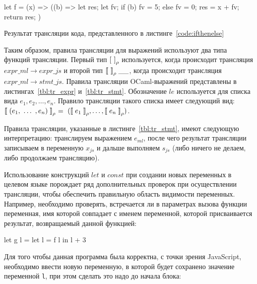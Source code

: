 \begin{listing}
\begin{pyglist}[language=ocaml,numbers=none,numbersep=5pt, fontsize=\small]
let f = (x) => ((b) => {
    let res;
    let fv;
    if (b) {fv = 5;} else {fv = 0;}
    res = x + fv;
    return res;
})
\end{pyglist}
\caption{Результат трансляции кода, представленного в листинге~\ref{code:ifthenelse}}
\label{code:ifthenelse_tr}
\end{listing}

Таким образом, правила трансляции для выражений используют два типа функций трансляции. Первый тип $\mathrel{{[}}~\mathrel{{]}}_{\rho}$ используется, когда происходит трансляция $expr\_ml \to expr\_js$ и второй тип $\mathrel{{\llbracket}}~\mathrel{{\rrbracket}}_{\rho} \_ \_$, когда происходит трансляция $expr\_ml \to stmt\_js$. Правила трансляции OCaml-выражений представлены в листингах~\ref{tbl:tr_expr} и~\ref{tbl:tr_stmt}. Обозначение $le$ используется для списка вида $e_1, e_2, \ldots, e_n$. Правило трансляции такого списка имеет следующий вид: $\mathrel{{\llbracket}} (e_1, ~\ldots~, e_n) \mathrel{{\rrbracket}} _{\rho} ~=~ (\mathrel{{\llbracket}} e_1 \mathrel{{\rrbracket}} _{\rho}, \ldots, \mathrel{{\llbracket}} e_n \mathrel{{\rrbracket}} _{\rho})$.

Правила трансляции, указанные в листинге~\ref{tbl:tr_stmt}, имеют следующую интерпретацию: транслируем выражением $e_{ml}$, после чего результат трансляции записываем в переменную $x_{js}$ и дальше выполняем $s_{js}$ (либо ничего не делаем, либо продолжаем трансляцию).

Использование конструкций $let$ и $const$ при создании новых переменных в целевом языке порождает ряд дополнительных проверок при осуществлении трансляции, чтобы обеспечить правильную область видимости переменных. Например, необходимо проверять, встречается ли в параметрах вызова функции переменная, имя которой совпадает с именем переменной, которой присваивается результат, возвращаемый данной функцией:

\begin{listing}
\begin{pyglist}[language=ocaml,numbers=none,numbersep=5pt, fontsize=\small]
    let g l = 
        let l = f l in 
        l + 3
\end{pyglist}
\end{listing}

Для того чтобы данная программа была корректна, с точки зрения JavaScript, необходимо ввести новую переменную, в которой будет сохранено значение переменной \verb|l|, при этом сделать это надо до начала блока:

